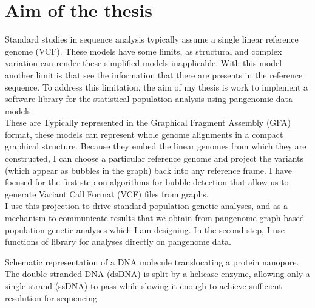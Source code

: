 
\chapter{Aim of the thesis} %

\label{Chapter4} %




Standard studies in sequence analysis typically assume a single linear reference genome (VCF). 
These models have some limits, as structural and complex variation can render these simplified models inapplicable. With this model another limit is that see the information that there are presents in the reference sequence. To address this limitation, the aim of my thesis is work to implement a software library for the statistical population analysis using pangenomic data models.\\ 

These are Typically represented in the Graphical Fragment Assembly (GFA) format, these models can represent whole genome alignments in a compact graphical structure. Because they embed the linear genomes from which they are constructed, I can choose a particular reference genome and project the variants (which appear as bubbles in the graph) back into any reference frame. I have focused for the first step on algorithms for bubble detection that allow us to generate Variant Call Format (VCF) files from graphs.\\

I use this projection to drive standard population genetic analyses, and as a mechanism to communicate results that we obtain from pangenome graph based population genetic analyses which I am designing.
In the second step, I use functions of library for analyses directly on pangenome data.


Schematic representation of a DNA molecule translocating a protein nanopore. The double-stranded DNA (dsDNA) is split by a helicase enzyme, allowing only a single strand (ssDNA) to pass while slowing it enough to achieve sufficient resolution for sequencing